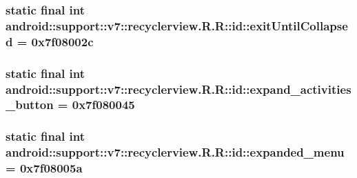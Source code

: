 \hypertarget{classandroid_1_1support_1_1v7_1_1recyclerview_1_1_r_1_1id_b70dc424c3af707f6edc4fb1c4620c1a}{
\subsubsection[{exitUntilCollapsed}]{\setlength{\rightskip}{0pt plus 5cm}static final int android::support::v7::recyclerview.R.R::id::exitUntilCollapsed = 0x7f08002c}}
\label{classandroid_1_1support_1_1v7_1_1recyclerview_1_1_r_1_1id_b70dc424c3af707f6edc4fb1c4620c1a}


\hypertarget{classandroid_1_1support_1_1v7_1_1recyclerview_1_1_r_1_1id_83f2afc48467a15145feba774b69ce9d}{
\subsubsection[{expand\_\-activities\_\-button}]{\setlength{\rightskip}{0pt plus 5cm}static final int android::support::v7::recyclerview.R.R::id::expand\_\-activities\_\-button = 0x7f080045}}
\label{classandroid_1_1support_1_1v7_1_1recyclerview_1_1_r_1_1id_83f2afc48467a15145feba774b69ce9d}


\hypertarget{classandroid_1_1support_1_1v7_1_1recyclerview_1_1_r_1_1id_c8db95a3b024f81a89db9fe42d084e58}{
\subsubsection[{expanded\_\-menu}]{\setlength{\rightskip}{0pt plus 5cm}static final int android::support::v7::recyclerview.R.R::id::expanded\_\-menu = 0x7f08005a}}
\label{classandroid_1_1support_1_1v7_1_1recyclerview_1_1_r_1_1id_c8db95a3b024f81a89db9fe42d084e58}


